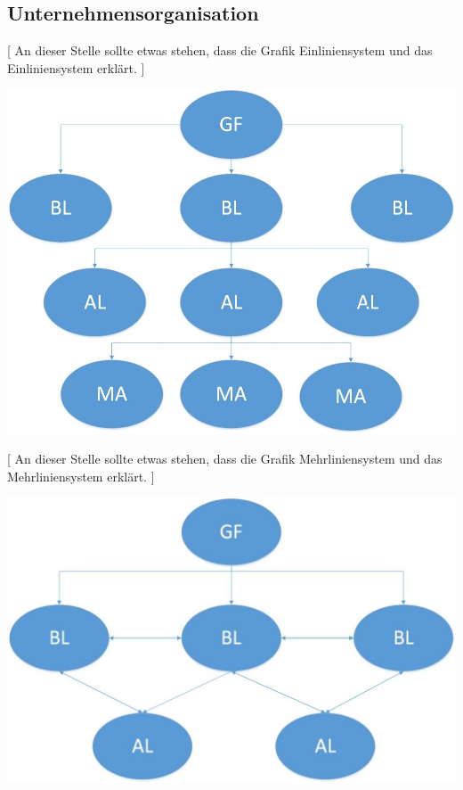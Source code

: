

\subsection{Unternehmensorganisation}

[ An dieser Stelle sollte etwas stehen, dass die Grafik Einliniensystem und das Einliniensystem erklärt. ]

\includegraphics[scale=0.3]{pictures/lf02-pic/lf02-einliniensystem.jpg}

[ An dieser Stelle sollte etwas stehen, dass die Grafik Mehrliniensystem und das Mehrliniensystem erklärt. ]

\includegraphics[scale=0.3]{pictures/lf02-pic/lf02-mehrliniensystem.jpg}

